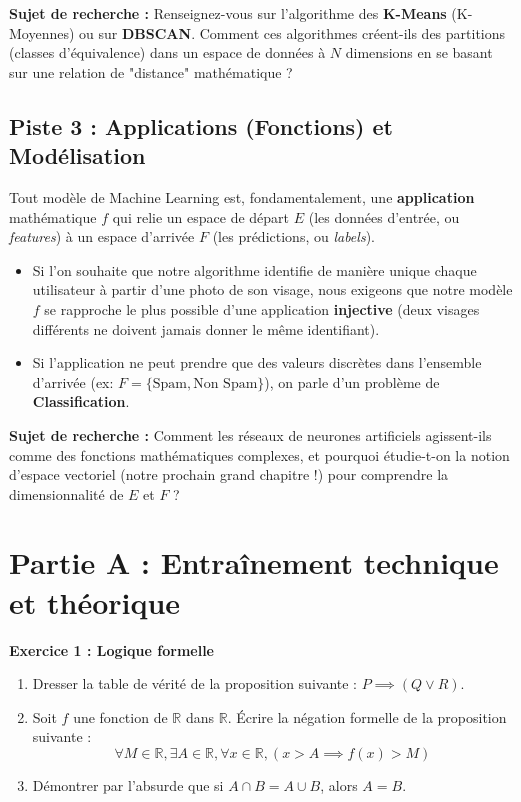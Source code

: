 \textbf{Sujet de recherche :} Renseignez-vous sur l'algorithme des \textbf{K-Means} (K-Moyennes) ou sur \textbf{DBSCAN}. Comment ces algorithmes créent-ils des partitions (classes d'équivalence) dans un espace de données à $N$ dimensions en se basant sur une relation de "distance" mathématique ?

\subsection*{Piste 3 : Applications (Fonctions) et Modélisation}
Tout modèle de Machine Learning est, fondamentalement, une \textbf{application} mathématique $f$ qui relie un espace de départ $E$ (les données d'entrée, ou \textit{features}) à un espace d'arrivée $F$ (les prédictions, ou \textit{labels}).
\begin{itemize}
    \item Si l'on souhaite que notre algorithme identifie de manière unique chaque utilisateur à partir d'une photo de son visage, nous exigeons que notre modèle $f$ se rapproche le plus possible d'une application \textbf{injective} (deux visages différents ne doivent jamais donner le même identifiant).
    \item Si l'application ne peut prendre que des valeurs discrètes dans l'ensemble d'arrivée (ex: $F = \{\text{Spam}, \text{Non Spam}\}$), on parle d'un problème de \textbf{Classification}.
\end{itemize}

\textbf{Sujet de recherche :} Comment les réseaux de neurones artificiels agissent-ils comme des fonctions mathématiques complexes, et pourquoi étudie-t-on la notion d'espace vectoriel (notre prochain grand chapitre !) pour comprendre la dimensionnalité de $E$ et $F$ ?

\section*{Partie A : Entraînement technique et théorique}

\textbf{Exercice 1 : Logique formelle}
\begin{enumerate}
    \item Dresser la table de vérité de la proposition suivante : $P \implies (Q \lor R)$.
    \item Soit $f$ une fonction de $\mathbb{R}$ dans $\mathbb{R}$. Écrire la négation formelle de la proposition suivante :
    $$ \forall M \in \mathbb{R}, \exists A \in \mathbb{R}, \forall x \in \mathbb{R}, (x > A \implies f(x) > M) $$
    \item Démontrer par l'absurde que si $A \cap B = A \cup B$, alors $A = B$.
\end{enumerate}

